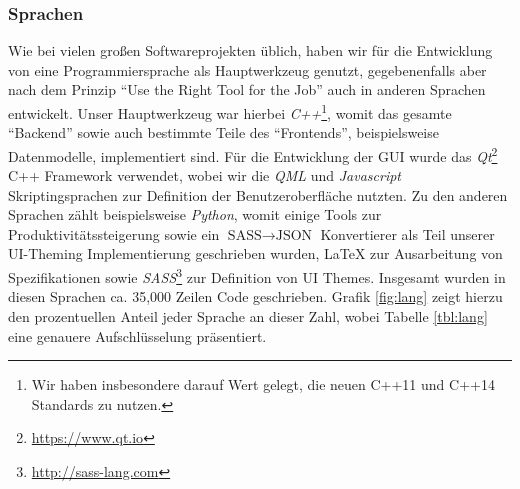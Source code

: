 
\subsubsection{Sprachen}
\label{team:orga-workflow-lang}

Wie bei vielen großen Softwareprojekten üblich, haben wir für die Entwicklung
von \erasim{} eine Programmiersprache als Hauptwerkzeug genutzt, gegebenenfalls
aber nach dem Prinzip ``Use the Right Tool for the Job'' auch in anderen
Sprachen entwickelt. Unser Hauptwerkzeug war hierbei \emph{C++}\footnote{Wir
haben insbesondere darauf Wert gelegt, die neuen C++11 und C++14 Standards zu
nutzen.}, womit das gesamte ``Backend'' sowie auch bestimmte Teile des
``Frontends'', beispielsweise Datenmodelle, implementiert sind. Für die
Entwicklung der GUI wurde das \emph{Qt}\footnote{\url{https://www.qt.io}} C++
Framework verwendet, wobei wir die \emph{QML} und \emph{Javascript}
Skriptingsprachen zur Definition der Benutzeroberfläche nutzten. Zu den anderen
Sprachen zählt beispielsweise \emph{Python}, womit einige Tools zur
Produktivitätssteigerung sowie ein $\text{SASS} \rightarrow \text{JSON}$
Konvertierer als Teil unserer UI-Theming Implementierung geschrieben wurden,
\LaTeX{} zur Ausarbeitung von Spezifikationen sowie
\emph{SASS}\footnote{\url{http://sass-lang.com}} zur Definition von UI Themes.
Insgesamt wurden in diesen Sprachen ca. 35,000 Zeilen Code geschrieben. Grafik
\ref{fig:lang} zeigt hierzu den prozentuellen Anteil jeder Sprache an dieser
Zahl, wobei Tabelle \ref{tbl:lang} eine genauere Aufschlüsselung präsentiert.

